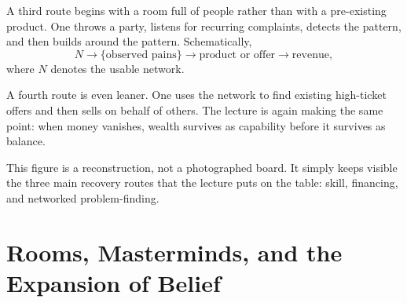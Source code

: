 A third route begins with a room full of people rather than with a pre-existing product. One throws a party, listens for recurring complaints, detects the pattern, and then builds around the pattern. Schematically,
\begin{equation}
N \longrightarrow \{\text{observed pains}\}
\longrightarrow
\text{product or offer}
\longrightarrow
\text{revenue},
\end{equation}
where \(N\) denotes the usable network.

A fourth route is even leaner. One uses the network to find existing high-ticket offers and then sells on behalf of others. The lecture is again making the same point: when money vanishes, wealth survives as capability before it survives as balance.

\begin{figure}
\centering
{}
\end{figure}

This figure is a reconstruction, not a photographed board. It simply keeps visible the three main recovery routes that the lecture puts on the table: skill, financing, and networked problem-finding.

\section{Rooms, Masterminds, and the Expansion of Belief}

